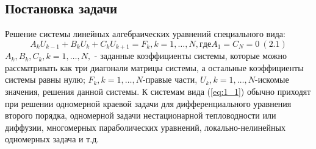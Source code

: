 \subsection{Постановка задачи}
Решение системы линейных алгебраических уравнений специального вида:
\[A_kU_{k-1} + B_kU_k + C_kU_{k+1} = F_k,  k=1,…,N , где A_1=C_N=0~(2.1) \]\label{eq:1_1}
\(A_k, B_k, C_k, k=1,…, N,\) - заданные коэффициенты системы, которые можно рассматривать как три диагонали матрицы системы, а остальные коэффициенты системы равны нулю;
\(F_k, k=1,…, N\)-правые части, \(U_k, k=1,…, N\)-искомые значения, решения данной системы. К системам вида (\ref{eq:1_1}) обычно приходят при решении одномерной краевой задачи
для дифференциального уравнения второго порядка, одномерной задачи нестационарной тепловодности или диффузии, многомерных параболических уравнений, локально-нелинейных
одномерных задача и т.д.
